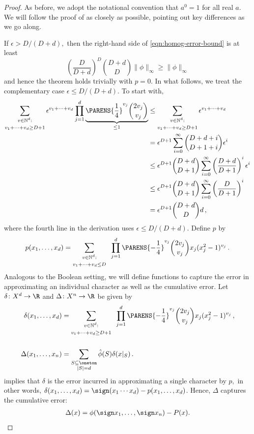 \begin{proof}
As before, we adopt
the notational convention that $a^0=1$ for all real
$a$. We will follow the proof of
 as
closely as possible, pointing out key differences as we
go along.

If $\epsilon> D/{(D+d)},$ then the right-hand side of 
\eqref{eqn:homog-error-bound} is at least 
\[
\left(\frac D{D+d}\right)^D{D+d\choose D}
\|\phi\|_\infty\geq \|\phi\|_\infty
\] 
and hence the
theorem holds trivially with $p=0$. In what follows, 
we treat the complementary case 
$\epsilon\leq D/{(D+d)}$. To start with,
\begin{align}
\sum_{\substack{\rule{0mm}{2mm}v\in\mathbb
N^d:\\\rule{0mm}{3mm}v_1+\cdots+v_d\geq D+1}} 
 \epsilon^{v_1+\cdots+v_d}
\prod_{j=1}^d\underbrace{\PARENS{\frac14}^{v_j}{2v_j \choose v_j}}_{\leq 1}
&\leq\sum_{\substack{\rule{0mm}{2mm}v\in\mathbb
N^d:\\\rule{0mm}{3mm}v_1+\cdots+v_d\geq D+1}} 
 \epsilon^{v_1+\cdots+v_d}\nonumber\\
&=\epsilon^{D+1}\sum_{i=0}^\infty{D+d+i\choose D+1+i}\epsilon^i
\nonumber\\
&\leq\epsilon^{D+1}{D+d\choose D+1}\sum_{i=0}^\infty\left(\frac{D+d}{D+1}\right)^i\epsilon^i
\nonumber\\
&\leq\epsilon^{D+1}{D+d\choose D+1}\sum_{i=0}^\infty\left(\frac{D}{D+1}\right)^i
\nonumber\\
&=\epsilon^{D+1}{D+d\choose D}d\,,
\label{eqn:coefficients-converge}
\end{align}
where the fourth line in the derivation uses
$\epsilon\leq D/(D+d)$.
Define $p$ by 
\begin{align*}
p(x_1,\dots,x_d) = 
\sum_{\substack{\rule{0mm}{2mm}v\in\mathbb
N^d:\\\rule{0mm}{3mm}v_1+\cdots+v_d\leq D}} 
\;\; \prod_{j=1}^d\PARENS{-\frac14}^{v_j}{2v_j \choose v_j}
x_j(x_j^2-1)^{v_j}\,.
\end{align*} Analogous to the Boolean setting, we will
define functions to capture the error in approximating
an individual character as well as the 
cumulative error. Let $\delta\colon X^d\to\R$ and
$\Delta\colon X^n\to\R$ be given by 
\begin{align*}
\delta(x_1,\dots,x_d) &=
\sum_{\substack{\rule{0mm}{2mm}v\in\mathbb
N^d:\\\rule{0mm}{3mm}v_1+\cdots+v_d\geq D+1}} 
\;\; \prod_{j=1}^d\PARENS{-\frac14}^{v_j}{2v_j \choose v_j}
x_j(x_j^2-1)^{v_j}\,, \\
\rule{0mm}{9mm}\Delta(x_1,\dots,x_n) &=
\sum_{\substack{S\subseteq\oneton\\|S|=d}}
\hat\phi(S)\delta(x|_S)\,.
\end{align*}
 implies that $\delta$ is
the error incurred in approximating a single
character by $p,$ in other words,
$\delta(x_1,\dots,x_d)= \sign(x_1\cdots
x_d)-p(x_1,\dots,x_d)$. Hence, $\Delta$ captures the cumulative
error:
\begin{align}
\Delta(x) = \phi(\sign x_1,\dots,\sign x_n)-P(x).
\label{eqn:Delta-cumulative}
\end{align}


\end{proof}
